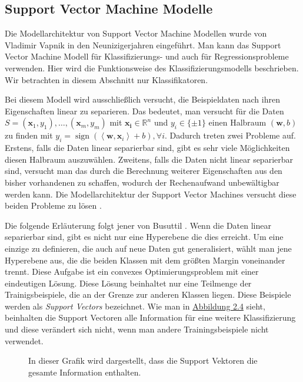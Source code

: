 \subsection{Support Vector Machine Modelle}

Die Modellarchitektur von Support Vector Machine Modellen wurde von Vladimir Vapnik \cite{SVMVapnik} in den Neunizigerjahren eingef\"uhrt. Man kann das
Support Vector Machine Modell f\"ur Klassifizierungs- und auch f\"ur Regressionsprobleme verwenden. Hier wird die Funktionsweise des Klassifizierungsmodells
beschrieben. Wir betrachten in diesem Abschnitt nur Klassifikatoren.

Bei diesem Modell wird ausschlie{\ss}lich versucht, die Beispieldaten nach ihren Eigenschaften linear zu separieren. Das bedeutet, man versucht f\"ur die
Daten $S = (\mathbf{x}_1,y_1),\dots, (\mathbf{x}_m, y_m)$ mit $\mathbf{x_i} \in \mathbb{R}^n$ und $y_i \in \{\pm1\}$ einen Halbraum $(\mathbf{w},b)$ zu finden
mit $y_i = \operatorname{sign}(\left\langle \mathbf{w},\mathbf{x}_i\right\rangle + b), \forall i$. Dadurch treten zwei Probleme auf. Erstens, falls die Daten linear separierbar sind,
gibt es sehr viele M\"oglichkeiten diesen Halbraum auszuw\"ahlen. Zweitens, falls die Daten nicht linear separierbar sind, versucht man das durch die Berechnung
weiterer Eigenschaften aus den bisher vorhandenen zu schaffen, wodurch der Rechenaufwand unbew\"altigbar werden kann. Die Modellarchitektur der Support Vector Machines versucht
diese beiden Probleme zu l\"osen \cite[Kapitel 15]{shalev}.

Die folgende Erl\"auterung folgt jener von Busuttil \cite{SVM1}. Wenn die Daten linear separierbar sind, gibt es nicht nur eine Hyperebene die dies erreicht.
Um eine einzige zu definieren, die auch auf neue Daten gut generalisiert, w\"ahlt man jene Hyperebene aus, die die beiden Klassen mit dem gr\"o{\ss}ten Margin
voneinander trennt. Diese Aufgabe ist ein convexes Optimierungsproblem mit einer eindeutigen L\"osung. Diese L\"osung beinhaltet nur eine Teilmenge der Trainigsbeispiele, die
an der Grenze zur anderen Klassen liegen. Diese Beispiele werden als \textit{Support Vectors} bezeichnet. Wie man in \hyperref[fig:svm2]{Abbildung 2.4} sieht, beinhalten die Support Vectoren
alle Information f\"ur eine weitere Klassifizierung und diese ver\"andert sich nicht, wenn man andere Trainingsbeispiele nicht verwendet.

\begin{figure}[ht]
	\label{fig:svm1}
	\begin{center}
		\begin{tiny}
		\end{tiny}
	\end{center}
	\caption[Darstellung der Support Vektoren]
	{In dieser Grafik wird dargestellt, dass die Support Vektoren die gesamte Information enthalten.}
\end{figure}




